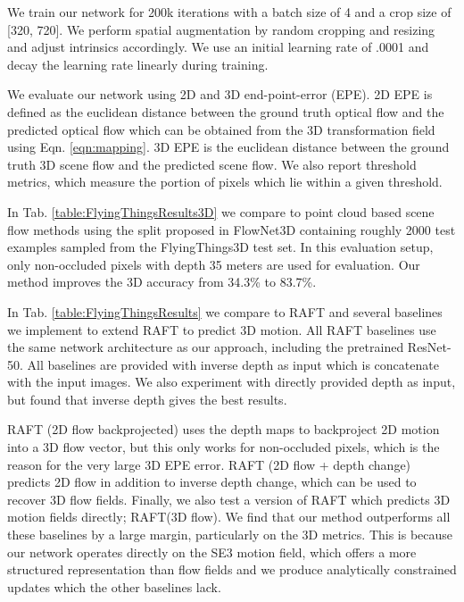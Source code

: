 \documentclass[final]{cvpr}
\begin{document}
We train our network for 200k iterations with a batch size of 4 and a crop size of [320, 720]. We perform spatial augmentation by random cropping and resizing and adjust intrinsics accordingly. We use an initial learning rate of .0001 and decay the learning rate linearly during training. 

We evaluate our network using 2D and 3D end-point-error (EPE). 2D EPE is defined as the euclidean distance between the ground truth optical flow and the predicted optical flow which can be obtained from the 3D transformation field using Eqn. \ref{eqn:mapping}. 3D EPE is the euclidean distance between the ground truth 3D scene flow and the predicted scene flow. We also report threshold metrics, which measure the portion of pixels which lie within a given threshold.

In Tab. \ref{table:FlyingThingsResults3D} we compare to point cloud based scene flow methods\cite{liu2019flownet3d,wang2020flownet3d++,puy20flot} using the split proposed in FlowNet3D\cite{liu2019flownet3d} containing roughly 2000 test examples sampled from the FlyingThings3D test set. In this evaluation setup, only non-occluded pixels with depth 35 meters are used for evaluation. Our method improves the 3D  accuracy from 34.3\% to 83.7\%.

In Tab. \ref{table:FlyingThingsResults} we compare to RAFT\cite{teed2020raft} and several baselines we implement to extend RAFT to predict 3D motion. All RAFT baselines use the same network architecture as our approach, including the pretrained ResNet-50. All baselines are provided with inverse depth as input which is concatenate with the input images. We also experiment with directly provided depth as input, but found that inverse depth gives the best results.

RAFT (2D flow backprojected) uses the depth maps to backproject 2D motion into a 3D flow vector, but this only works for non-occluded pixels, which is the reason for the very large 3D EPE error. RAFT (2D flow + depth change) predicts 2D flow in addition to inverse depth change, which can be used to recover 3D flow fields. Finally, we also test a version of RAFT which predicts 3D motion fields directly; RAFT(3D flow). We find that our method outperforms all these baselines by a large margin, particularly on the 3D metrics. This is because our network operates directly on the SE3 motion field, which offers a more structured representation than flow fields and we produce analytically constrained updates which the other baselines lack.
\end{document}
